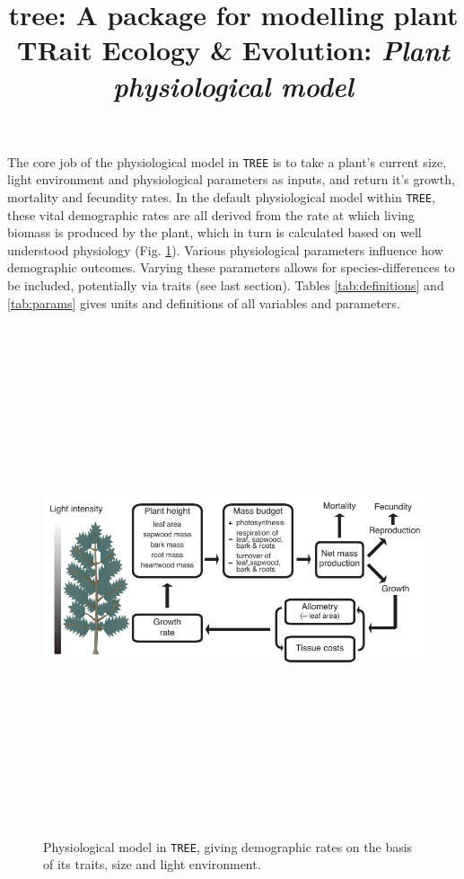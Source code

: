 \documentclass[10pt,twoside]{article}
\title{tree: A package for modelling plant TRait Ecology \& Evolution:
\emph{Plant physiological model}}
\date{}
\begin{document}
\maketitle


The core job of the physiological model in \texttt{TREE} is to take a plant's
current size, light environment and physiological parameters as inputs,
and return it's growth, mortality and fecundity rates. In the default
physiological model within \texttt{TREE}, these vital demographic rates are all
derived from the rate at which living biomass is produced by the plant,
which in turn is calculated based on well understood physiology (Fig.
\ref{fig:schematic-phys}). Various physiological parameters
influence how demographic outcomes. Varying these parameters allows for
species-differences to be included, potentially via traits (see last
section). Tables
\ref{tab:definitions} and \ref{tab:params} gives units and definitions of all variables
and parameters. 

\begin{figure}[h!]
\centering
\includegraphics[width=15cm,height=15cm,keepaspectratio]{schematic-phys}
\caption{Physiological model in \texttt{TREE}, giving 
demographic rates on the basis of its traits, size and light environment.}
\label{fig:schematic-phys}
\end{figure}
\end{document}
